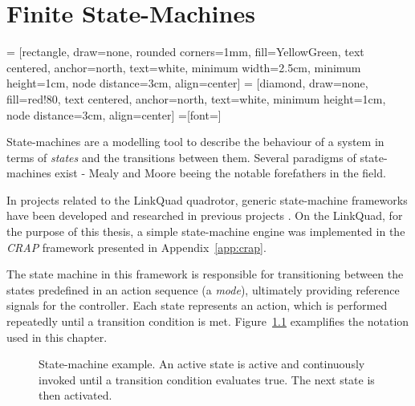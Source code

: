 \chapter{Finite State-Machines}
\label{cha:logic}
     = [rectangle, draw=none, rounded corners=1mm, fill=YellowGreen,
                    text centered, anchor=north, text=white, minimum width=2.5cm, minimum height=1cm, node distance=3cm, align=center]
     = [diamond, draw=none, fill=red!80,
                    text centered, anchor=north, text=white, minimum height=1cm, node distance=3cm, align=center]
    =[font=\scriptsize]

    State-machines are a modelling tool to describe the behaviour of a system
    in terms of \textit{states} and the transitions between them.
    Several paradigms of state-machines exist - Mealy and Moore beeing the notable forefathers in the field.

    In projects related to the LinkQuad quadrotor, generic state-machine
    frameworks have been developed and researched in previous projects \citep{Merz06,Wzorek11}.
    On the LinkQuad, for the purpose of this thesis, a simple state-machine engine
    was implemented in the \textit{CRAP} framework presented in Appendix~\ref{app:crap}.

    The state machine in this framework is responsible for transitioning between the
    states predefined in an action sequence (a \textit{mode}), ultimately
    providing reference signals for the controller.
    Each state represents an action, which is performed repeatedly until
    a transition condition is met.
    Figure~\ref{fig:logic:statemachine} examplifies the notation used in this chapter.

    \begin{figure}[H]
        \noindent{}
        \caption{State-machine example. An active state is active and continuously invoked until a transition condition evaluates true. The next state is then activated.}
        \label{fig:logic:statemachine}
    \end{figure}

